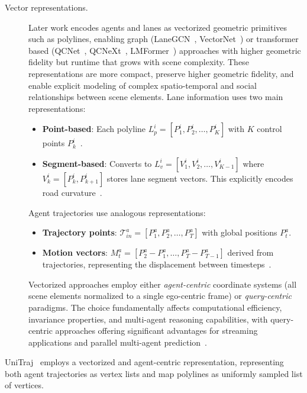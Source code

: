 \begin{description}
\item[Vector representations.] Later work encodes agents and lanes as vectorized geometric primitives such as polylines, enabling graph (LaneGCN~\cite{liang2020learning}, VectorNet~\cite{VectorNet2020}) or transformer based (QCNet~\cite{qcnetZhou2023}, QCNeXt~\cite{qcnextZhou2023}, LMFormer~\cite{lmformerYadav2025}) approaches with higher geometric fidelity but runtime that grows with scene complexity. These representations are more compact, preserve higher geometric fidelity, and enable explicit modeling of complex spatio-temporal and social relationships between scene elements. Lane information uses two main representations:
\begin{itemize}
  \item \textbf{Point-based}: Each polyline \(L_p^i = [P_1^i, P_2^i, \ldots, P_K^i]\) with \(K\) control points \(P_k^i\)~\cite{VectorNet2020, zhou2022hivt}.
  \item \textbf{Segment-based}: Converts to \(L_v^i = [V_1^i, V_2^i, \ldots, V_{K-1}^i]\) where \(V_{k}^i = [P_k^i, P_{k+1}^i]\) stores lane segment vectors. This explicitly encodes road curvature~\cite{liang2020learning,zhou2022hivt,qcnetZhou2023}.
\end{itemize}
Agent trajectories use analogous representations:
\begin{itemize}
  \item \textbf{Trajectory points}: \(\mathcal{T}_{in}^a = [P_1^a, P_2^a, \ldots, P_T^a]\) with global positions \(P_t^a\).
  \item \textbf{Motion vectors}: \(M_t^a = [P_{2}^a - P_{1}^a, \ldots, P_{T}^a - P_{T-1}^a]\) derived from trajectories, representing the displacement between timesteps~\cite{lmformerYadav2025}.
\end{itemize}
Vectorized approaches employ either \emph{agent-centric} coordinate systems (all scene elements normalized to a single ego-centric frame) or \emph{query-centric} paradigms. The choice fundamentally affects computational efficiency, invariance properties, and multi-agent reasoning capabilities, with query-centric approaches offering significant advantages for streaming applications and parallel multi-agent prediction~\cite{qcnetZhou2023}. %
\end{description}
UniTraj~\cite{unitrajFeng2024} employs a vectorized and agent-centric representation, representing both agent trajectories as vertex lists and map polylines as uniformly sampled list of vertices.


